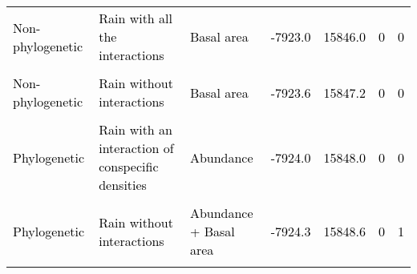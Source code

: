 \documentclass[
  12pt,
  letterpaper,
  DIV=11,
  numbers=noendperiod]{scrartcl}
\begin{document}
\begin{table}[H]
{\begin{tabular}[t]{lllllll}
\textcolor{black}{Non-phylogenetic} & \textcolor{black}{Rain with all the interactions} & \textcolor{black}{Basal area} & \textcolor{black}{-7923.0} & \textcolor{black}{15846.0} & \textcolor{black}{0} & \textcolor{black}{0}\\
\cellcolor{gray!6}{\textcolor{black}{Phylogenetic}} & \cellcolor{gray!6}{\textcolor{black}{Rain with an interaction of conspecific densities}} & \cellcolor{gray!6}{\textcolor{black}{Basal area}} & \cellcolor{gray!6}{\textcolor{black}{-7923.5}} & \cellcolor{gray!6}{\textcolor{black}{15847.0}} & \cellcolor{gray!6}{\textcolor{black}{0}} & \cellcolor{gray!6}{\textcolor{black}{0}}\\
\textcolor{black}{Non-phylogenetic} & \textcolor{black}{Rain without interactions} & \textcolor{black}{Basal area} & \textcolor{black}{-7923.6} & \textcolor{black}{15847.2} & \textcolor{black}{0} & \textcolor{black}{0}\\
\addlinespace
\cellcolor{gray!6}{\textcolor{black}{Phylogenetic}} & \cellcolor{gray!6}{\textcolor{black}{No rain}} & \cellcolor{gray!6}{\textcolor{black}{Abundance}} & \cellcolor{gray!6}{\textcolor{black}{-7923.9}} & \cellcolor{gray!6}{\textcolor{black}{15847.7}} & \cellcolor{gray!6}{\textcolor{black}{0}} & \cellcolor{gray!6}{\textcolor{black}{0}}\\
\textcolor{black}{Phylogenetic} & \textcolor{black}{Rain with an interaction of conspecific densities} & \textcolor{black}{Abundance} & \textcolor{black}{-7924.0} & \textcolor{black}{15848.0} & \textcolor{black}{0} & \textcolor{black}{0}\\
\cellcolor{gray!6}{\textcolor{black}{Non-phylogenetic}} & \cellcolor{gray!6}{\textcolor{black}{Rain with an interaction of conspecific densities}} & \cellcolor{gray!6}{\textcolor{black}{Basal area}} & \cellcolor{gray!6}{\textcolor{black}{-7924.3}} & \cellcolor{gray!6}{\textcolor{black}{15848.5}} & \cellcolor{gray!6}{\textcolor{black}{0}} & \cellcolor{gray!6}{\textcolor{black}{3}}\\
\textcolor{black}{Phylogenetic} & \textcolor{black}{Rain without interactions} & \textcolor{black}{Abundance + Basal area} & \textcolor{black}{-7924.3} & \textcolor{black}{15848.6} & \textcolor{black}{0} & \textcolor{black}{1}\\
\cellcolor{gray!6}{\textcolor{black}{Phylogenetic}} & \cellcolor{gray!6}{\textcolor{black}{No rain}} & \cellcolor{gray!6}{\textcolor{black}{Basal area}} & \cellcolor{gray!6}{\textcolor{black}{-7925.0}} & \cellcolor{gray!6}{\textcolor{black}{15849.9}} & \cellcolor{gray!6}{\textcolor{black}{0}} & \cellcolor{gray!6}{\textcolor{black}{1}}\\

\end{tabular}}
\end{table}
\end{document}
